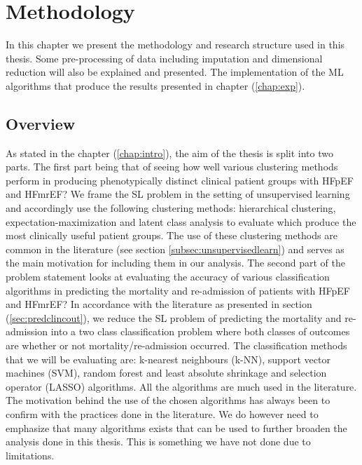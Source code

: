 \documentclass[../thesis.tex]{subfiles}
\begin{document}
\chapter{Methodology}
\label{chap:method}

\noindent In this chapter we present the methodology and research structure used in this thesis. Some pre-processing of data including imputation and dimensional reduction will also be explained and presented. The implementation of the ML algorithms that produce the results presented in chapter (\ref{chap:exp}).

\section{Overview}

\noindent As stated in the chapter (\ref{chap:intro}), the aim of the thesis is split into two parts. The first part being that of seeing how well various clustering methods perform in producing phenotypically distinct clinical patient groups with HFpEF and HFmrEF? We frame the SL problem in the setting of unsupervised learning and accordingly use the following clustering methods: hierarchical clustering, expectation-maximization and latent class analysis to evaluate which produce the most clinically useful patient groups. The use of these clustering methods are common in the literature (see section \ref{subsec:unsupervisedlearn}) and serves as the main motivation for including them in our analysis. The second part of the problem statement looks at evaluating the accuracy of various classification algorithms in predicting the mortality and re-admission of patients with HFpEF and HFmrEF? In accordance with the literature as presented in section (\ref{sec:predclincout}), we reduce the SL problem of predicting the mortality and re-admission into a two class classification problem where both classes of outcomes are whether or not mortality/re-admission  \noindent occurred. The classification methods that we will be evaluating are: k-nearest neighbours (k-NN), support vector machines (SVM), random forest and least absolute shrinkage and selection operator (LASSO) algorithms. All the algorithms are much used in the literature. The motivation behind the use of the chosen algorithms has always been to confirm with the practices done in the literature. We do however need to emphasize that many algorithms exists that can be used to further broaden the analysis done in this thesis. This is something we have not done due to limitations.\\
\end{document}
